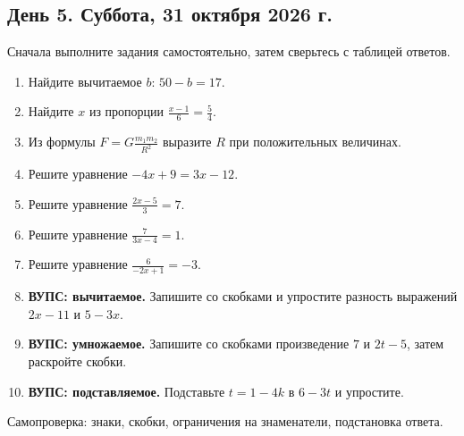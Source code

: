 \documentclass[a4paper,12pt]{article}
\begin{document}
\subsection*{День 5. Суббота, 31 октября 2026 г.}
\textcolor{muted}{Сначала выполните задания самостоятельно, затем сверьтесь с таблицей ответов.}
\begin{enumerate}[label=\arabic*.,leftmargin=1.8em,itemsep=11pt,topsep=7pt]
\item Найдите вычитаемое $b$: $50-b=17$.
\item Найдите $x$ из пропорции $\displaystyle\frac{x-1}{6}=\frac54$.
\item Из формулы $\displaystyle F=G\frac{m_1m_2}{R^2}$ выразите $R$ при положительных величинах.
\item Решите уравнение $-4x+9=3x-12$.
\item Решите уравнение $\displaystyle\frac{2x-5}{3}=7$.
\item Решите уравнение $\displaystyle\frac7{3x-4}=1$.
\item Решите уравнение $\displaystyle\frac6{-2x+1}=-3$.
\item \textbf{ВУПС: вычитаемое.} Запишите со скобками и упростите разность выражений $2x-11$ и $5-3x$.
\item \textbf{ВУПС: умножаемое.} Запишите со скобками произведение $7$ и $2t-5$, затем раскройте скобки.
\item \textbf{ВУПС: подставляемое.} Подставьте $t=1-4k$ в $6-3t$ и упростите.
\end{enumerate}
\vfill\small\textcolor{muted}{Самопроверка: знаки, скобки, ограничения на знаменатели, подстановка ответа.}\normalsize
\clearpage
\end{document}
